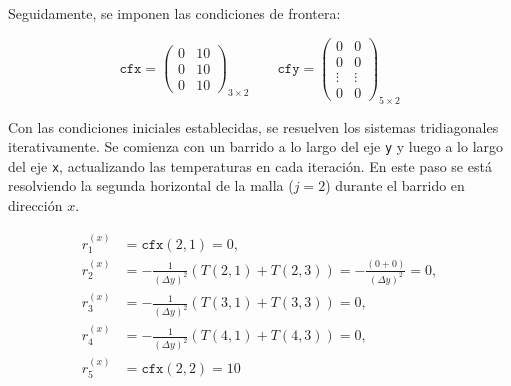 \documentclass[11pt,a4paper]{article}
\begin{document}
Seguidamente, se imponen las condiciones de frontera:

\begin{equation}
  \texttt{cfx} = \begin{pmatrix}
    0 & 10 \\
    0 & 10 \\
    0 & 10
\end{pmatrix} _{3 \times 2} \qquad 
  \texttt{cfy} = \begin{pmatrix}
    0 & 0 \\
    0 & 0 \\
    \vdots & \vdots \\
    0 & 0
\end{pmatrix} _{5 \times 2}
\end{equation}

Con las condiciones iniciales establecidas, se resuelven los sistemas 
tridiagonales iterativamente. Se comienza con un barrido a lo largo del eje 
\texttt{y} y luego a lo largo del eje \texttt{x}, actualizando las temperaturas 
en cada iteraci\'on. En este paso se est\'a resolviendo la segunda horizontal de
la malla (\(j=2\)) durante el barrido en direcci\'on \(x\).

\begin{center}
\begin{minipage}[c]{0.38\textwidth}
\centering
{}
\end{minipage}
\hfill
\begin{minipage}[c]{0.58\textwidth}
\begin{equation}
\begin{aligned}
r_1^{(x)} &= \texttt{cfx}(2,1) = 0,\\
r_2^{(x)} &= - \frac{1}{(\Delta y)^2} \left( T(2,1) + T(2,3) \right) 
= - \frac{(0+0)}{(\Delta y)^2} = 0,\\
r_3^{(x)} &= - \frac{1}{(\Delta y)^2} \left( T(3,1) + T(3,3) \right) = 0,\\
r_4^{(x)} &= - \frac{1}{(\Delta y)^2} \left( T(4,1) + T(4,3) \right) = 0,\\
r_5^{(x)} &= \texttt{cfx}(2,2) = 10
\end{aligned}
\end{equation}
\end{minipage}
\end{center}
\end{document}
